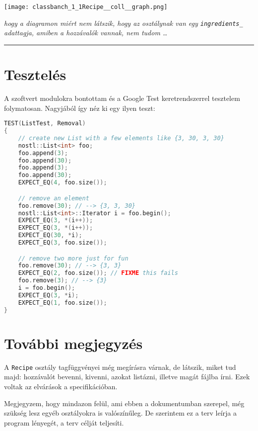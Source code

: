 \documentclass[a4paper]{article}
\begin{document}
\begin{center}
\texttt{[image: classbanch\_1\_1Recipe\_\_coll\_\_graph.png]}
\end{center}

\textit{hogy a diagramon miért nem látszik, hogy az osztálynak van egy
\texttt{ingredients\_} adattagja, amiben a hozzávalók vannak, nem tudom \ldots}

\hspace{2cm}
\hrule
\hspace{2cm}

\section*{Tesztelés}

A szoftvert modulokra bontottam és a Google Test keretrendszerrel tesztelem
folymatosan. Nagyjából így néz ki egy ilyen teszt:

\begin{lstlisting}[language=C++]
TEST(ListTest, Removal)
{
	// create new List with a few elements like {3, 30, 3, 30}
	nostl::List<int> foo;
	foo.append(3);
	foo.append(30);
	foo.append(3);
	foo.append(30);
	EXPECT_EQ(4, foo.size());

	// remove an element
	foo.remove(30); // --> {3, 3, 30}
	nostl::List<int>::Iterator i = foo.begin();
	EXPECT_EQ(3, *(i++));
	EXPECT_EQ(3, *(i++));
	EXPECT_EQ(30, *i);
	EXPECT_EQ(3, foo.size());

	// remove two more just for fun
	foo.remove(30); // --> {3, 3}
	EXPECT_EQ(2, foo.size()); // FIXME this fails
	foo.remove(3); // --> {3}
	i = foo.begin();
	EXPECT_EQ(3, *i);
	EXPECT_EQ(1, foo.size());
}
\end{lstlisting}

\section*{További megjegyzés}

A \texttt{Recipe} osztály tagfüggvényei még megírásra várnak, de látszik, miket
tud majd: hozzávalót bevenni, kivenni, azokat listázni, illetve magát fájlba
írni. Ezek voltak az elvárások a specifikációban.

Megjegyzem, hogy mindazon felül, ami ebben a dokumentumban szerepel, még szükség
lesz egyéb osztályokra is valószínűleg. De szerintem ez a terv leírja a program
lényegét, a terv célját teljesíti.
\end{document}
